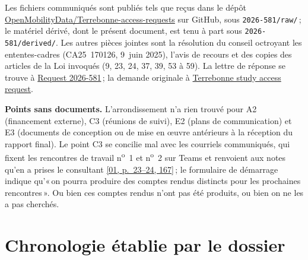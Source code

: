\documentclass[11pt,letterpaper]{article}
\newcommand{\repourl}{https://github.com/OpenMobilityData/Terrebonne-access-requests}
\newcommand{\repo}[1]{\href{\repourl}{#1}}
\newcommand{\doc}[2]{\href{\repourl/blob/main/#1}{#2}}
\newcommand{\pagesurl}{https://openmobilitydata.github.io/Terrebonne-access-requests}
\newcommand{\pgl}[3]{\href{\pagesurl/\csname bundle#1\endcsname\#page=#2}{\textsf{\small[#1, p.~#3]}}}
\begin{document}
Les fichiers communiqués sont publiés tels que reçus dans le dépôt
\repo{OpenMobilityData/Terrebonne-access-requests} sur GitHub, sous
\texttt{2026-581/raw/}\,; le matériel dérivé, dont le présent document, est
tenu à part sous \texttt{2026-581/derived/}. Les autres pièces jointes sont
la résolution du conseil octroyant les ententes-cadres (CA25~170126,
9~juin 2025), l'avis de recours et des copies des articles de la Loi
invoqués (9, 23, 24, 37, 39, 53 à 59). La lettre de réponse se trouve à
\doc{2026-581/raw/response_2026-10-09.pdf}{Request 2026-581}\,; la demande
originale à \doc{2026-581/raw/request_2026-09-11.pdf}{Terrebonne study
access request}.

\textbf{Points sans documents.} L'arrondissement n'a rien trouvé pour A2
(financement externe), C3 (réunions de suivi), E2 (plans de communication)
et E3 (documents de conception ou de mise en œuvre antérieurs à la
réception du rapport final). Le point C3 se concilie mal avec les
courriels communiqués, qui fixent les rencontres de travail n\textsuperscript{o}~1 et
n\textsuperscript{o}~2 sur Teams et renvoient aux notes qu'en a prises le consultant
\pgl{01}{23}{23--24, 167}\,; le formulaire de démarrage indique qu'«\,on
pourra produire des comptes rendus distincts pour les prochaines
rencontres\,». Ou bien ces comptes rendus n'ont pas été produits, ou bien on
ne les a pas cherchés.

\section{Chronologie établie par le dossier}
\end{document}
